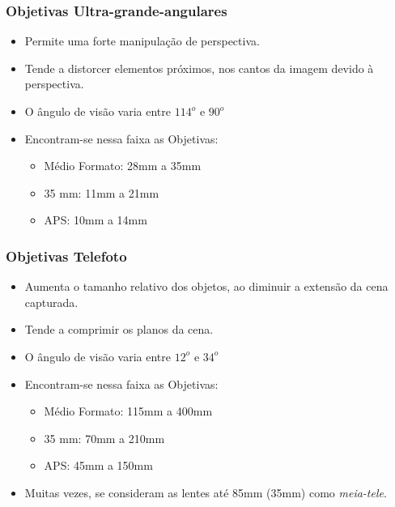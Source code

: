 \begin{frame}
    \frametitle{Objetivas Ultra-grande-angulares}
    \begin{itemize}
        \item Permite uma forte manipulação de perspectiva.
        \item Tende a distorcer elementos próximos, nos cantos da imagem devido à perspectiva.
        \item O ângulo de visão varia entre $114^o$ e $90^o$
        \item Encontram-se nessa faixa as Objetivas:

        {\small \begin{itemize}
            \item Médio Formato: 28mm a 35mm
            \item 35 mm: 11mm a 21mm
            \item APS: 10mm a 14mm
        \end{itemize}}
    \end{itemize}
\end{frame}

\begin{frame}
    \frametitle{Objetivas Telefoto}
    \begin{itemize}
        \item Aumenta o tamanho relativo dos objetos, ao diminuir a extensão da cena capturada.
        \item Tende a comprimir os planos da cena.
        \item O ângulo de visão varia entre $12^o$ e $34^o$
        \item Encontram-se nessa faixa as Objetivas:

        {\small \begin{itemize}
            \item Médio Formato: 115mm a 400mm
            \item 35 mm: 70mm a 210mm
            \item APS: 45mm a 150mm
        \end{itemize}}
        \item Muitas vezes, se consideram as lentes até 85mm (35mm) como \textit{meia-tele}.
    \end{itemize}
\end{frame}

